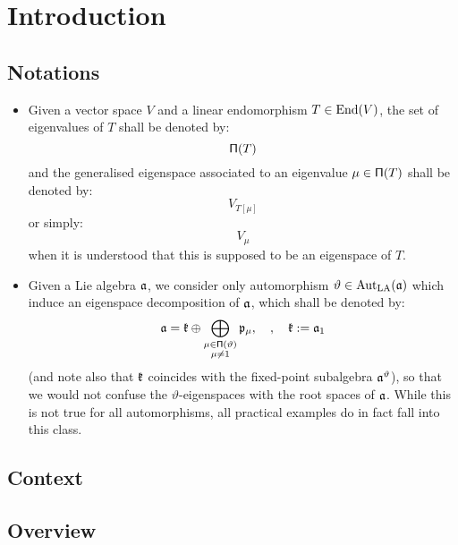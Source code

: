 \section{Introduction}
    \subsection{Notations}
        \begin{convention}[Eigenspaces] \label{conv: eigenspaces}
            \begin{itemize}
                \item Given a vector space $V$ and a linear endomorphism $T \in \operatorname{End}(V)$, the set of eigenvalues of $T$ shall be denoted by:
                    $$\mathsf{\Pi}(T)$$
                and the generalised eigenspace associated to an eigenvalue $\mu \in \mathsf{\Pi}(T)$ shall be denoted by:
                    $$V_{T[\mu]}$$
                or simply:
                    $$V_{\mu}$$
                when it is understood that this is supposed to be an eigenspace of $T$.
                \item Given a Lie algebra $\mathfrak{a}$, we consider only automorphism $\vartheta \in \operatorname{Aut}_{\mathrm{LA}}(\mathfrak{a})$ which induce an eigenspace decomposition of $\mathfrak{a}$, which shall be denoted by:
                    $$\mathfrak{a} = \mathfrak{k} \oplus \bigoplus_{ \substack{\mu \in \mathsf{\Pi}(\vartheta)\\\mu \not = 1} } \mathfrak{p}_{\mu}, \quad, \quad \mathfrak{k} := \mathfrak{a}_1$$
                (and note also that $\mathfrak{k}$ coincides with the fixed-point subalgebra $\mathfrak{a}^{\vartheta}$), so that we would not confuse the $\vartheta$-eigenspaces with the root spaces of $\mathfrak{a}$. While this is not true for all automorphisms, all practical examples do in fact fall into this class.
            \end{itemize}
        \end{convention}

    \subsection{Context}

    \subsection{Overview}